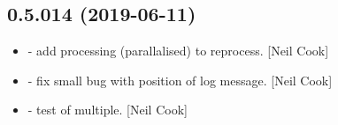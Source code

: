 \documentclass[a4paper,10pt,english]{report}
\begin{document}
\subsection{0.5.014 (2019-06-11)}
\label{\detokenize{misc/changelog:id123}}\begin{itemize}
\item {} 
 - add processing (parallalised) to reprocess. {[}Neil
Cook{]}

\item {} 
 - fix small bug with position of log message. {[}Neil
Cook{]}

\item {} 
 - test of multiple. {[}Neil Cook{]}

\end{itemize}
\end{document}

